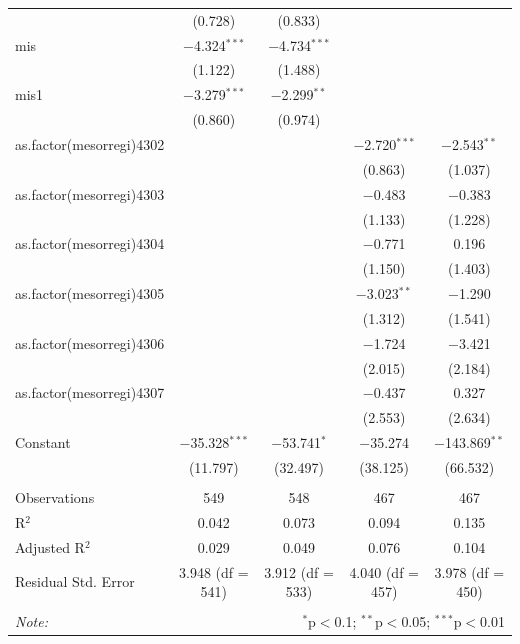 \documentclass[
  a4paper,
]{article}
\begin{document}
\begin{center}
{\begin{tabular}{@{\extracolsep{3pt}}lcccc}
  & (0.728) & (0.833) &  &  \\ 
  mis & $-$4.324$^{***}$ & $-$4.734$^{***}$ &  &  \\ 
  & (1.122) & (1.488) &  &  \\ 
  mis1 & $-$3.279$^{***}$ & $-$2.299$^{**}$ &  &  \\ 
  & (0.860) & (0.974) &  &  \\ 
  as.factor(mesorregi)4302 &  &  & $-$2.720$^{***}$ & $-$2.543$^{**}$ \\ 
  &  &  & (0.863) & (1.037) \\ 
  as.factor(mesorregi)4303 &  &  & $-$0.483 & $-$0.383 \\ 
  &  &  & (1.133) & (1.228) \\ 
  as.factor(mesorregi)4304 &  &  & $-$0.771 & 0.196 \\ 
  &  &  & (1.150) & (1.403) \\ 
  as.factor(mesorregi)4305 &  &  & $-$3.023$^{**}$ & $-$1.290 \\ 
  &  &  & (1.312) & (1.541) \\ 
  as.factor(mesorregi)4306 &  &  & $-$1.724 & $-$3.421 \\ 
  &  &  & (2.015) & (2.184) \\ 
  as.factor(mesorregi)4307 &  &  & $-$0.437 & 0.327 \\ 
  &  &  & (2.553) & (2.634) \\ 
  Constant & $-$35.328$^{***}$ & $-$53.741$^{*}$ & $-$35.274 & $-$143.869$^{**}$ \\ 
  & (11.797) & (32.497) & (38.125) & (66.532) \\ 
 \hline \\[-1.8ex] 
Observations & 549 & 548 & 467 & 467 \\ 
R$^{2}$ & 0.042 & 0.073 & 0.094 & 0.135 \\ 
Adjusted R$^{2}$ & 0.029 & 0.049 & 0.076 & 0.104 \\ 
Residual Std. Error & 3.948 (df = 541) & 3.912 (df = 533) & 4.040 (df = 457) & 3.978 (df = 450) \\ 
\hline 
\hline \\[-1.8ex] 
\textit{Note:}  & \multicolumn{4}{r}{$^{*}$p$<$0.1; $^{**}$p$<$0.05; $^{***}$p$<$0.01} \\ 
\end{tabular} 
}\end{center}
\end{document}
